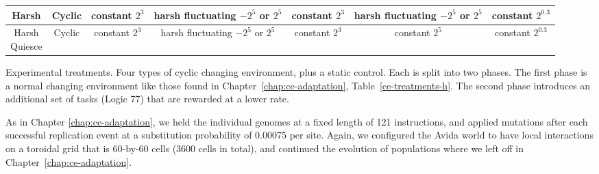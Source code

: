 \documentclass[PhD]{msu-thesis}
\begin{document}
\begin{table}[]
\begin{tabular}{|c|c||c|c||c|c|c|}
	Harsh & Cyclic & \makecell{constant \\ $2^3$} & \makecell{harsh \\ fluctuating \\ $-2^5$ or $2^5$} & \makecell{constant \\ $2^3$} & \makecell{harsh \\ fluctuating \\ $-2^5$ or $2^5$} & \makecell{constant \\ $2^{0.3}$} \\\hline
	\makecell{Harsh \\ Quiesce} & Cyclic & \makecell{constant \\ $2^3$} & \makecell{harsh \\ fluctuating \\ $-2^5$ or $2^5$} & \makecell{constant \\ $2^3$} & \makecell{constant \\ $2^5$} & \makecell{constant \\ $2^{0.3}$} \\\hline
	\end{tabular} 

	\begin{flushleft} Experimental treatments. Four types of cyclic changing environment, plus a static control. Each is split into two phases. The first phase is a normal changing environment like those found in Chapter~\ref{chap:ce-adaptation}, Table~\ref{ce-treatments-h}. The second phase introduces an additional set of tasks (Logic 77) that are rewarded at a lower rate.
	\end{flushleft}
	\label{cel-treatments}
	\end{table}


As in Chapter \ref{chap:ce-adaptation}, we held the individual genomes at a fixed length of 121 instructions, and applied mutations after each successful replication event at a substitution probability of 0.00075 per site. Again, we configured the Avida world to have local interactions on a toroidal grid that is 60-by-60 cells (3600 cells in total), and continued the evolution of populations where we left off in Chapter~\ref{chap:ce-adaptation}.
\end{document}
